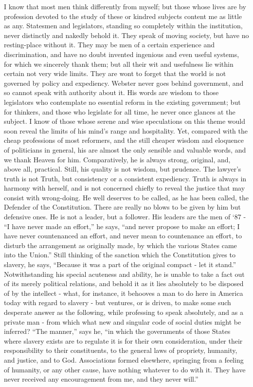 \documentclass[letterpaper,12pt,english]{sphinxmanual}
\begin{document}
I know that most men think differently from myself; but those whose lives are by profession devoted to the study of these or kindred subjects content me as little as any. Statesmen and legislators, standing so completely within the institution, never distinctly and nakedly behold it. They speak of moving society, but have no resting-place without it. They may be men of a certain experience and discrimination, and have no doubt invented ingenious and even useful systems, for which we sincerely thank them; but all their wit and usefulness lie within certain not very wide limits. They are wont to forget that the world is not governed by policy and expediency. Webster never goes behind government, and so cannot speak with authority about it. His words are wisdom to those legislators who contemplate no essential reform in the existing government; but for thinkers, and those who legislate for all time, he never once glances at the subject. I know of those whose serene and wise speculations on this theme would soon reveal the limits of his mind's range and hospitality. Yet, compared with the cheap professions of most reformers, and the still cheaper wisdom and eloquence of politicians in general, his are almost the only sensible and valuable words, and we thank Heaven for him. Comparatively, he is always strong, original, and, above all, practical. Still, his quality is not wisdom, but prudence. The lawyer's truth is not Truth, but consistency or a consistent expediency. Truth is always in harmony with herself, and is not concerned chiefly to reveal the justice that may consist with wrong-doing. He well deserves to be called, as he has been called, the Defender of the Constitution. There are really no blows to be given by him but defensive ones. He is not a leader, but a follower. His leaders are the men of `87 - ``I have never made an effort,'' he says, ``and never propose to make an effort; I have never countenanced an effort, and never mean to countenance an effort, to disturb the arrangement as originally made, by which the various States came into the Union.'' Still thinking of the sanction which the Constitution gives to slavery, he says, ``Because it was a part of the original compact - let it stand.'' Notwithstanding his special acuteness and ability, he is unable to take a fact out of its merely political relations, and behold it as it lies absolutely to be disposed of by the intellect - what, for instance, it behooves a man to do here in America today with regard to slavery - but ventures, or is driven, to make some such desperate answer as the following, while professing to speak absolutely, and as a private man - from which what new and singular code of social duties might be inferred? ``The manner,'' says he, ``in which the governments of those States where slavery exists are to regulate it is for their own consideration, under their responsibility to their constituents, to the general laws of propriety, humanity, and justice, and to God. Associations formed elsewhere, springing from a feeling of humanity, or any other cause, have nothing whatever to do with it. They have never received any encouragement from me, and they never will.''
\end{document}
